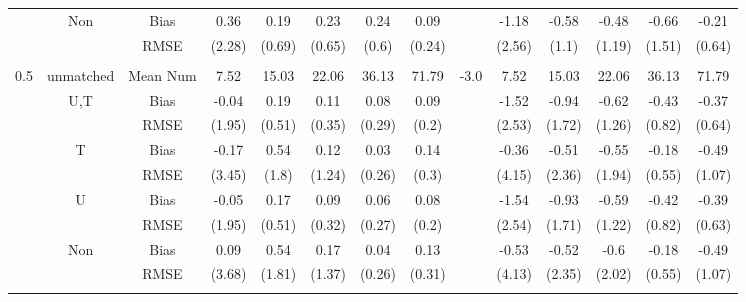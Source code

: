 \begin{tabular}{@{\extracolsep{5pt}}lc|cccccc|lccccc}
 & Non & Bias & 0.36 & 0.19 & 0.23 & 0.24 & 0.09 &  & -1.18 & -0.58 & -0.48 & -0.66 & -0.21 \\
 &  & RMSE & (2.28) & (0.69) & (0.65) & (0.6) & (0.24) &  & (2.56) & (1.1) & (1.19) & (1.51) & (0.64) \\
 &  &  &  &  &  &  &  &  &  &  &  &  &  \\
0.5 & unmatched & Mean Num & 7.52 & 15.03 & 22.06 & 36.13 & 71.79 & -3.0 & 7.52 & 15.03 & 22.06 & 36.13 & 71.79 \\
 & U,T & Bias & -0.04 & 0.19 & 0.11 & 0.08 & 0.09 &  & -1.52 & -0.94 & -0.62 & -0.43 & -0.37 \\
 &  & RMSE & (1.95) & (0.51) & (0.35) & (0.29) & (0.2) &  & (2.53) & (1.72) & (1.26) & (0.82) & (0.64) \\
 & T & Bias & -0.17 & 0.54 & 0.12 & 0.03 & 0.14 &  & -0.36 & -0.51 & -0.55 & -0.18 & -0.49 \\
 &  & RMSE & (3.45) & (1.8) & (1.24) & (0.26) & (0.3) &  & (4.15) & (2.36) & (1.94) & (0.55) & (1.07) \\
 & U & Bias & -0.05 & 0.17 & 0.09 & 0.06 & 0.08 &  & -1.54 & -0.93 & -0.59 & -0.42 & -0.39 \\
 &  & RMSE & (1.95) & (0.51) & (0.32) & (0.27) & (0.2) &  & (2.54) & (1.71) & (1.22) & (0.82) & (0.63) \\
 & Non & Bias & 0.09 & 0.54 & 0.17 & 0.04 & 0.13 &  & -0.53 & -0.52 & -0.6 & -0.18 & -0.49 \\
 &  & RMSE & (3.68) & (1.81) & (1.37) & (0.26) & (0.31) &  & (4.13) & (2.35) & (2.02) & (0.55) & (1.07) \\
 &  &  &  &  &  &  &  &  &  &  &  &  &  \\
\hline 
\bottomrule 
\end{tabular}

